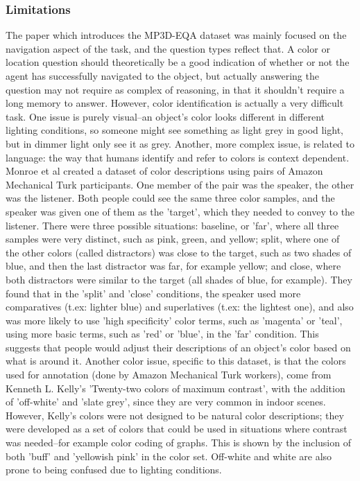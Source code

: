 \subsubsection{Limitations}
The paper which introduces the MP3D-EQA dataset was mainly focused on the navigation aspect of the task, and the question types reflect that. A color or location question should theoretically be a good indication of whether or not the agent has successfully navigated to the object, but actually answering the question may not require as complex of reasoning, in that it shouldn't require a long memory to answer.  However, color identification is actually a very difficult task. One issue is purely visual--an object's color looks different in different lighting conditions, so someone might see something as light grey in good light, but in dimmer light only see it as grey. Another, more complex issue, is related to language: the way that humans identify and refer to colors is context dependent. Monroe et al created a dataset of color descriptions using pairs of Amazon Mechanical Turk participants\cite{colorsincontext}. One member of the pair was the speaker, the other was the listener. Both people could see the same three color samples, and the speaker was given one of them as the 'target', which they needed to convey to the listener. There were three possible situations: baseline, or 'far', where all three samples were very distinct, such as pink, green, and yellow; split, where one of the other colors (called distractors) was close to the target, such as two shades of blue, and then the last distractor was far, for example yellow; and close, where both distractors were similar to the target (all shades of blue, for example). They found that in the 'split' and 'close' conditions, the speaker used more comparatives (t.ex: lighter blue) and superlatives (t.ex: the lightest one), and also was more likely to use 'high specificity' color terms, such as 'magenta' or 'teal', using more basic terms, such as 'red' or 'blue', in the 'far' condition. This suggests that people would adjust their descriptions of an object's color based on what is around it. Another color issue, specific to this dataset, is that the colors used for annotation (done by Amazon Mechanical Turk workers), come from Kenneth L. Kelly's 'Twenty-two colors of maximum contrast', with the addition of 'off-white' and 'slate grey', since they are very common in indoor scenes\cite{kellycolors}. However, Kelly's colors were not designed to be natural color descriptions; they were developed as a set of colors that could be used in situations where contrast was needed--for example color coding of graphs. This is shown by the inclusion of both 'buff' and 'yellowish pink' in the color set. Off-white and white are also prone to being confused due to lighting conditions.\newline

